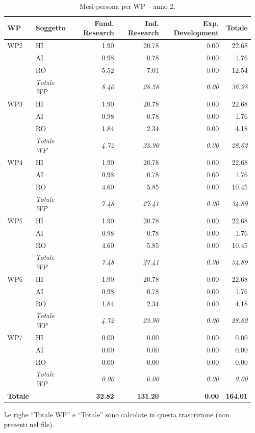 \documentclass{plan4ari_report}
\begin{document}
\begin{table}[H]\centering\small\caption{Mesi-persona per WP -- anno 2.}\label{tab:wp-w-y2}
\begin{tabular}{llrrrr}\toprule\textbf{WP} & \textbf{Soggetto} & \textbf{Fund. Research} & \textbf{Ind. Research} & \textbf{Exp. Development} & \textbf{Totale} \\\midrule
WP2 & HI & 1.90 & 20.78 & 0.00 & 22.68 \\
 & AI & 0.98 & 0.78 & 0.00 & 1.76 \\
 & RO & 5.52 & 7.01 & 0.00 & 12.54 \\
 & \textit{Totale WP} & \textit{8.40} & \textit{28.58} & \textit{0.00} & \textit{36.98} \\\midrule
WP3 & HI & 1.90 & 20.78 & 0.00 & 22.68 \\
 & AI & 0.98 & 0.78 & 0.00 & 1.76 \\
 & RO & 1.84 & 2.34 & 0.00 & 4.18 \\
 & \textit{Totale WP} & \textit{4.72} & \textit{23.90} & \textit{0.00} & \textit{28.62} \\\midrule
WP4 & HI & 1.90 & 20.78 & 0.00 & 22.68 \\
 & AI & 0.98 & 0.78 & 0.00 & 1.76 \\
 & RO & 4.60 & 5.85 & 0.00 & 10.45 \\
 & \textit{Totale WP} & \textit{7.48} & \textit{27.41} & \textit{0.00} & \textit{34.89} \\\midrule
WP5 & HI & 1.90 & 20.78 & 0.00 & 22.68 \\
 & AI & 0.98 & 0.78 & 0.00 & 1.76 \\
 & RO & 4.60 & 5.85 & 0.00 & 10.45 \\
 & \textit{Totale WP} & \textit{7.48} & \textit{27.41} & \textit{0.00} & \textit{34.89} \\\midrule
WP6 & HI & 1.90 & 20.78 & 0.00 & 22.68 \\
 & AI & 0.98 & 0.78 & 0.00 & 1.76 \\
 & RO & 1.84 & 2.34 & 0.00 & 4.18 \\
 & \textit{Totale WP} & \textit{4.72} & \textit{23.90} & \textit{0.00} & \textit{28.62} \\\midrule
WP7 & HI & 0.00 & 0.00 & 0.00 & 0.00 \\
 & AI & 0.00 & 0.00 & 0.00 & 0.00 \\
 & RO & 0.00 & 0.00 & 0.00 & 0.00 \\
 & \textit{Totale WP} & \textit{0.00} & \textit{0.00} & \textit{0.00} & \textit{0.00} \\
\midrule\textbf{Totale} & & \textbf{32.82} & \textbf{131.20} & \textbf{0.00} & \textbf{164.01} \\
\bottomrule\end{tabular}
\par\smallskip\footnotesize Le righe ``Totale WP'' e ``Totale'' sono calcolate in questa trascrizione (non presenti nel file).
\end{table}
\end{document}
